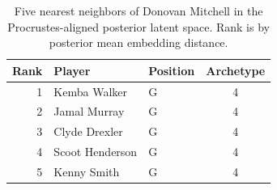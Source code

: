 \begin{table}[htbp]
  \centering\small
  \begin{tabular}{rllc}
    \toprule
    Rank & Player & Position & Archetype \\
    \midrule
    1 & Kemba Walker & G & 4 \\
    2 & Jamal Murray & G & 4 \\
    3 & Clyde Drexler & G & 4 \\
    4 & Scoot Henderson & G & 4 \\
    5 & Kenny Smith & G & 4 \\
    \bottomrule
  \end{tabular}
  \caption{Five nearest neighbors of Donovan Mitchell in the Procrustes-aligned posterior latent space. Rank is by posterior mean embedding distance.}
  \label{tab:Donovan_Mitchell_neighbors}
\end{table}

